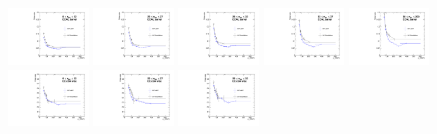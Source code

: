 \begin{figure}[!htbp]
\centering
\includegraphics[width=0.19\textwidth]{fig/compare_pv_EB_2017_0to22.pdf}
\includegraphics[width=0.19\textwidth]{fig/compare_pv_EB_2017_23to27.pdf}
\includegraphics[width=0.19\textwidth]{fig/compare_pv_EB_2017_28to32.pdf}
\includegraphics[width=0.19\textwidth]{fig/compare_pv_EB_2017_33to37.pdf}
\includegraphics[width=0.19\textwidth]{fig/compare_pv_EB_2017_38to200.pdf}\\
\includegraphics[width=0.19\textwidth]{fig/compare_pv_EE1_2017_0to22.pdf}
\includegraphics[width=0.19\textwidth]{fig/compare_pv_EE1_2017_23to27.pdf}
\includegraphics[width=0.19\textwidth]{fig/compare_pv_EE1_2017_28to32.pdf}

\end{figure}

